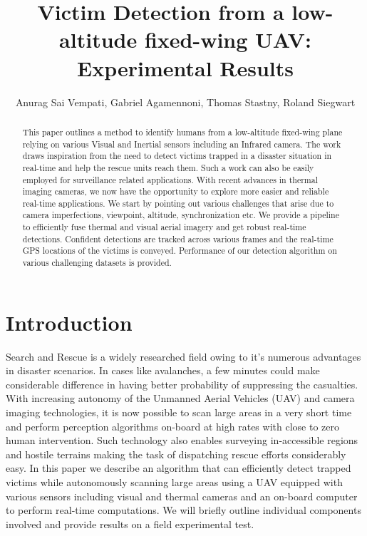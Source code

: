 \documentclass[runningheads]{llncs}
\begin{document}
\pagestyle{headings}

\mainmatter

\title{Victim Detection from a low-altitude fixed-wing UAV: Experimental Results}

\author{Anurag Sai Vempati, Gabriel Agamennoni, Thomas Stastny, Roland Siegwart}


\maketitle

\begin{abstract}
This paper outlines a method to identify humans from a low-altitude fixed-wing plane relying on various Visual and Inertial sensors including an Infrared camera. The work draws inspiration from the need to detect victims trapped in a disaster situation in real-time and help the rescue units reach them. Such a work can also be easily employed for surveillance related applications. With recent advances in thermal imaging cameras, we now have the opportunity to explore more easier and reliable real-time applications. We start by pointing out various challenges that arise due to camera imperfections, viewpoint, altitude, synchronization etc. We provide a pipeline to efficiently fuse thermal and visual aerial imagery and get robust real-time detections. Confident detections are tracked across various frames and the real-time GPS locations of the victims is conveyed. Performance of our detection algorithm on various challenging datasets is provided.
\end{abstract}


\section{Introduction}
Search and Rescue is a widely researched field owing to it's numerous advantages in disaster scenarios. In cases like avalanches, a few minutes could make considerable difference in having better probability of suppressing the casualties. With increasing autonomy of the Unmanned Aerial Vehicles (UAV) and camera imaging technologies, it is now possible to scan large areas in a very short time and perform perception algorithms on-board at high rates with close to zero human intervention. Such technology also enables surveying in-accessible regions and hostile terrains making the task of dispatching rescue efforts considerably easy. In this paper we describe an algorithm that can efficiently detect trapped victims while autonomously scanning large areas using a UAV equipped with various sensors including visual and thermal cameras and an on-board computer to perform real-time computations. We will briefly outline individual components involved and provide results on a field experimental test.
\end{document}

